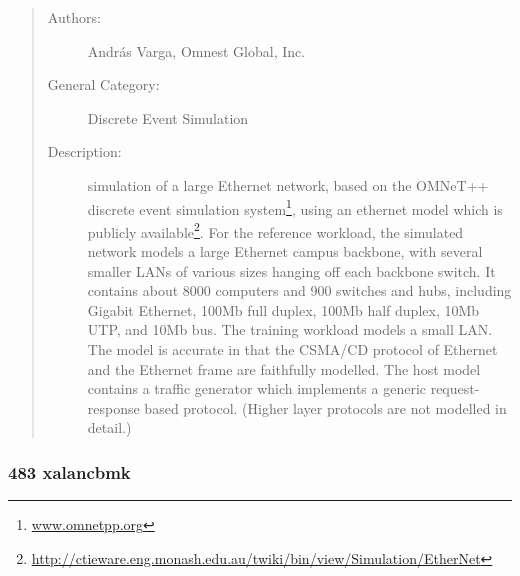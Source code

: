 \documentclass[onecolumn, openright, master, english, signatures]{dbrgrptt}
\begin{document}
\begin{quote}
\begin{description}
\item[Authors:] Andr\'as Varga, Omnest Global, Inc.

\item[General Category:] Discrete Event Simulation

\item[Description:] simulation of a large Ethernet network, based on the OMNeT++ discrete event simulation system\footnote{\url{www.omnetpp.org}}, using an ethernet model which is publicly available\footnote{\url{http://ctieware.eng.monash.edu.au/twiki/bin/view/Simulation/EtherNet}}.
For the reference workload, the simulated network models a large Ethernet campus backbone, with several smaller LANs of various sizes hanging off each backbone switch. It contains about 8000 computers and 900 switches and hubs, including Gigabit Ethernet, 100Mb full duplex, 100Mb half duplex, 10Mb UTP, and 10Mb bus. The training workload models a small LAN.
The model is accurate in that the CSMA/CD protocol of Ethernet and the Ethernet frame are faithfully modelled. The host model contains a traffic generator which implements a generic request-response based protocol. (Higher layer protocols are not modelled in detail.)
\end{description}
\end{quote}

\subsubsection{483 xalancbmk}
\end{document}
